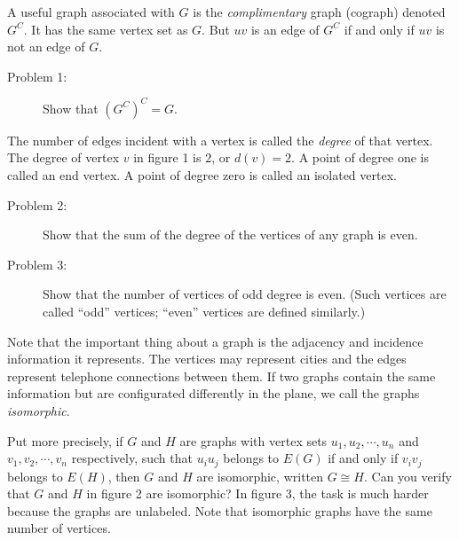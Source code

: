 \documentclass{article}
\begin{document}
A useful graph associated with $G$ is the \emph{complimentary} graph (cograph) denoted $G^C$. It has the same vertex set as $G$. But $uv$ is an edge of $G^C$ if and only if $uv$ is not an edge of $G$.

\begin{description}
\item[Problem 1:] Show that $(G^C)^C=G$.
\end{description}

The number of edges incident with a vertex is called the \emph{degree} of that vertex. The degree of vertex $v$ in figure 1 is $2$, or $d(v)=2$. A point of degree one is called an end vertex. A point of degree zero is called an isolated vertex.

\begin{description}
\item[Problem 2:] Show that the sum of the degree of the vertices of any graph is even.

\item[Problem 3:] Show that the number of vertices of odd degree is even. (Such vertices are called ``odd'' vertices; ``even'' vertices are defined similarly.) 
\end{description}

Note that the important thing about a graph is the adjacency and incidence information it represents. The vertices may represent cities and the edges represent telephone connections between them. If two graphs contain the same information but are configurated differently in the plane, we call the graphs \emph{isomorphic}.

Put more precisely, if $G$ and $H$ are graphs with vertex sets $u_1, u_2, \cdots, u_n$ and $v_1, v_2, \cdots, v_n$ respectively, such that $u_i u_j$ belongs to $E(G)$ if and only if $v_i v_j$ belongs to $E(H)$, then $G$ and $H$ are isomorphic, written $G \cong H$. Can you verify that $G$ and $H$ in figure 2 are isomorphic? In figure 3, the task is much harder because the graphs are unlabeled. Note that isomorphic graphs have the same number of vertices.
\end{document}
